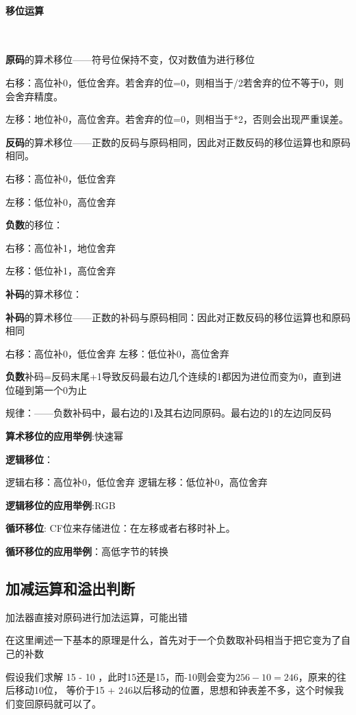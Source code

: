 \documentclass[12pt]{ctexart}
\begin{document}
\paragraph{移位运算}~{}

\textbf{原码}的算术移位——符号位保持不变，仅对数值为进行移位

右移：高位补0，低位舍弃。若舍弃的位=0，则相当于/2若舍弃的位不等于0，则会舍弃精度。

左移：地位补0，高位舍弃。若舍弃的位=0，则相当于*2，否则会出现严重误差。

\textbf{反码}的算术移位——正数的反码与原码相同，因此对正数反码的移位运算也和原码相同。

右移：高位补0，低位舍弃

左移：低位补0，高位舍弃

\textbf{负数}的移位：

右移：高位补1，地位舍弃

左移：低位补1，高位舍弃

\textbf{补码}的算术移位：

\textbf{补码}的算术移位——正数的补码与原码相同：因此对正数反码的移位运算也和原码相同

右移：高位补0，低位舍弃
左移：低位补0，高位舍弃

\textbf{负数}补码=反码末尾+1导致反码最右边几个连续的1都因为进位而变为0，直到进位碰到第一个0为止


规律：——负数补码中，最右边的1及其右边同原码。最右边的1的左边同反码


\textbf{算术移位的应用举例}:快速幂

\textbf{逻辑移位}：

逻辑右移：高位补0，低位舍弃
逻辑左移：低位补0，高位舍弃

\textbf{逻辑移位的应用举例}:RGB

\textbf{循环移位}:
CF位来存储进位：在左移或者右移时补上。

\textbf{循环移位的应用举例}：高低字节的转换

\subsection{加减运算和溢出判断}
加法器直接对原码进行加法运算，可能出错

在这里阐述一下基本的原理是什么，首先对于一个负数取补码相当于把它变为了自己的补数

假设我们求解 15 - 10 ，此时15还是15，而-10则会变为$256-10=246$，原来的往后移动10位，
等价于15 + 246以后移动的位置，思想和钟表差不多，这个时候我们变回原码就可以了。
\end{document}
